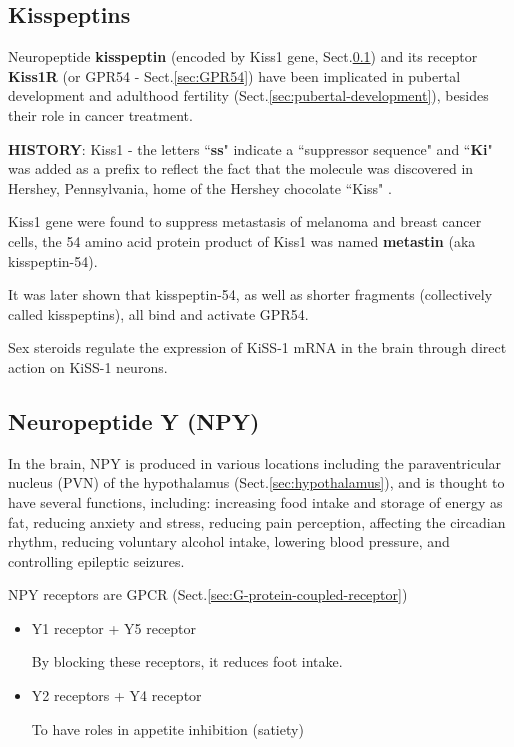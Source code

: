 \subsection{Kisspeptins}
\label{sec:kisspeptins}

Neuropeptide {\bf kisspeptin} (encoded by Kiss1 gene,
Sect.\ref{sec:kisspeptins}) and its receptor {\bf Kiss1R} (or GPR54 -
Sect.\ref{sec:GPR54}) have been implicated in pubertal development and adulthood
fertility (Sect.\ref{sec:pubertal-development}), besides their role in cancer
treatment.

\begin{mdframed}

{\bf HISTORY}: Kiss1 - the letters ``{\bf ss}" indicate a ``suppressor sequence"
and ``{\bf Ki}" was added as a prefix to reflect the fact that the molecule was
discovered in Hershey, Pennsylvania, home of the Hershey chocolate ``Kiss"
\citep{lee1996}.

Kiss1 gene were found to suppress metastasis of melanoma and
breast cancer cells, the 54 amino acid protein product of Kiss1
was named {\bf metastin} (aka kisspeptin-54).

It was later shown that kisspeptin-54, as well as shorter fragments
(collectively called kisspeptins), all bind and activate GPR54.

\end{mdframed}

Sex steroids regulate the expression of KiSS-1 mRNA in the brain through direct
action on KiSS-1 neurons. 

\subsection{Neuropeptide Y (NPY)}
\label{sec:neuropeptide-Y}

In the brain, NPY is produced in various locations including the 
paraventricular nucleus (PVN) of the hypothalamus (Sect.\ref{sec:hypothalamus}),
and is thought to have several functions, including: increasing food intake and
storage of energy as fat, reducing anxiety and stress, reducing pain perception,
affecting the circadian rhythm, reducing voluntary alcohol intake, lowering
blood pressure, and controlling epileptic seizures.

NPY receptors are GPCR (Sect.\ref{sec:G-protein-coupled-receptor})
\begin{itemize}
  \item Y1 receptor + Y5 receptor

By blocking these receptors, it reduces foot intake.
  
  \item Y2 receptors + Y4 receptor
  
  To have roles in appetite inhibition (satiety)
\end{itemize}


